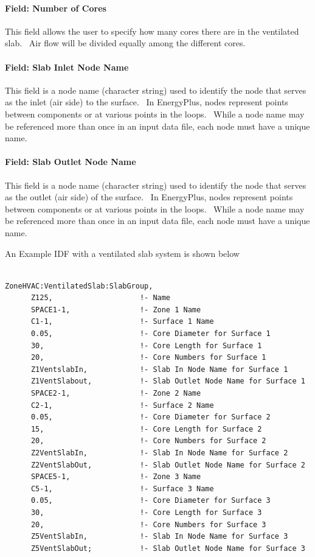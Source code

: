 \paragraph{Field: Number of Cores}\label{field-number-of-cores-1}

This field allows the user to specify how many cores there are in the ventilated slab.~ Air flow will be divided equally among the different cores.

\paragraph{Field: Slab Inlet Node Name}\label{field-slab-inlet-node-name}

This field is a node name (character string) used to identify the node that serves as the inlet (air side) to the surface.~ In EnergyPlus, nodes represent points between components or at various points in the loops.~ While a node name may be referenced more than once in an input data file, each node must have a unique name.

\paragraph{Field: Slab Outlet Node Name}\label{field-slab-outlet-node-name}

This field is a node name (character string) used to identify the node that serves as the outlet (air side) of the surface.~ In EnergyPlus, nodes represent points between components or at various points in the loops.~ While a node name may be referenced more than once in an input data file, each node must have a unique name.

An Example IDF with a ventilated slab system is shown below

\begin{lstlisting}

ZoneHVAC:VentilatedSlab:SlabGroup,
      Z125,                    !- Name
      SPACE1-1,                !- Zone 1 Name
      C1-1,                    !- Surface 1 Name
      0.05,                    !- Core Diameter for Surface 1
      30,                      !- Core Length for Surface 1
      20,                      !- Core Numbers for Surface 1
      Z1VentslabIn,            !- Slab In Node Name for Surface 1
      Z1VentSlabout,           !- Slab Outlet Node Name for Surface 1
      SPACE2-1,                !- Zone 2 Name
      C2-1,                    !- Surface 2 Name
      0.05,                    !- Core Diameter for Surface 2
      15,                      !- Core Length for Surface 2
      20,                      !- Core Numbers for Surface 2
      Z2VentSlabIn,            !- Slab In Node Name for Surface 2
      Z2VentSlabOut,           !- Slab Outlet Node Name for Surface 2
      SPACE5-1,                !- Zone 3 Name
      C5-1,                    !- Surface 3 Name
      0.05,                    !- Core Diameter for Surface 3
      30,                      !- Core Length for Surface 3
      20,                      !- Core Numbers for Surface 3
      Z5VentSlabIn,            !- Slab In Node Name for Surface 3
      Z5VentSlabOut;           !- Slab Outlet Node Name for Surface 3
\end{lstlisting}

